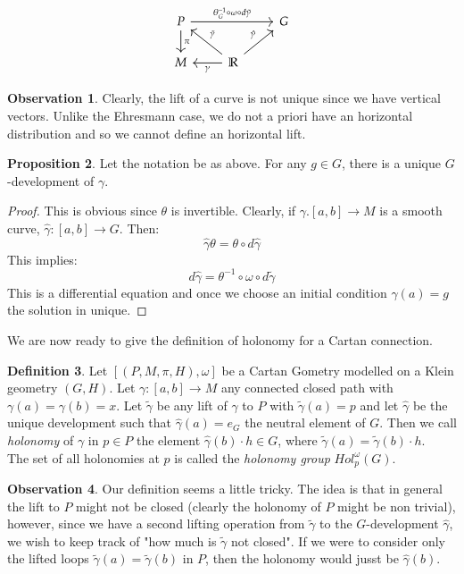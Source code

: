 \documentclass[12pt,a4paper]{report}
\theoremstyle{definition}
\newtheorem{Def}{Definition}[chapter]
\theoremstyle{Theorem}
\newtheorem{Prop}[Def]{Proposition}
\theoremstyle{break}
\theoremstyle{definition}
\newtheorem{Obs}[Def]{Observation}
\begin{document}
	$$
	\begin{tikzcd}
		P\arrow{d}{\pi} \arrow{rr}{\theta^{-1}_G\circ \omega\circ d\tilde{\gamma}}& & G\\
		M & \mathbb{R}\arrow{l}{\gamma} \arrow{ul}[swap]{\tilde{\gamma}}\arrow{ur}{\hat{\gamma}}
	\end{tikzcd}
	$$
	\begin{Obs}
		Clearly, the lift of a curve is not unique since we have vertical vectors. Unlike the Ehresmann case, we do not a priori have an horizontal distribution and so we cannot define an horizontal lift.
	\end{Obs}
	\begin{Prop}
		Let the notation be as above.
		For any $g\in G$, there is a unique $G$-development of $\gamma$.
	\end{Prop}
	\begin{proof}
		This is obvious since $\theta$ is invertible. Clearly, if $\gamma.[a,b]\rightarrow M$ is a smooth curve, $\hat{\gamma}:[a,b]\rightarrow G$. Then:
		$$\hat{\gamma}\theta=\theta\circ d\hat{\gamma}$$
		This implies:
		$$d\hat{\gamma}=\theta^{-1}\circ \omega\circ d\tilde{\gamma}$$
		This is a differential equation and once we choose an initial condition $\hat{\gamma}(a)=g$ the solution in unique.
	\end{proof}
	We are now ready to give the definition of holonomy for a Cartan connection.
	\begin{Def}
		Let $[(P,M,\pi,H),\omega]$ be a Cartan Gometry modelled on a Klein geometry $(G,H)$. Let $\gamma:[a,b]\rightarrow M$ any connected closed path with $\gamma(a)=\gamma(b)=x$. Let $\tilde{\gamma}$ be any lift of $\gamma$ to $P$ with $\tilde{\gamma}(a)=p$ and let $\hat{\gamma}$ be the unique development such that $\hat{\gamma}(a)=e_G$ the neutral element of $G$. Then we call \textit{holonomy} of $\gamma$ in $p\in P$ the element $\hat{\gamma}(b)\cdot h\in G$, where $\tilde{\gamma}(a)=\tilde{\gamma}(b)\cdot h$.
		\\ The set of all holonomies at $p$ is called the \textit{holonomy group} $Hol_p^\omega(G)$.
	\end{Def}
	\begin{Obs}
		Our definition seems a little tricky. The idea is that in general the lift to $P$ might not be closed (clearly the holonomy of $P$ might be non trivial), however, since we have a second lifting operation from $\tilde{\gamma}$ to the $G$-development $\hat{\gamma}$, we wish to keep track of "how much is $\tilde{\gamma}$ not closed". If we were to consider only the lifted loops $\tilde{\gamma}(a)=\tilde{\gamma}(b)$ in $P$, then the holonomy would jusst be $\hat{\gamma}(b)$.
	\end{Obs}
\end{document}

